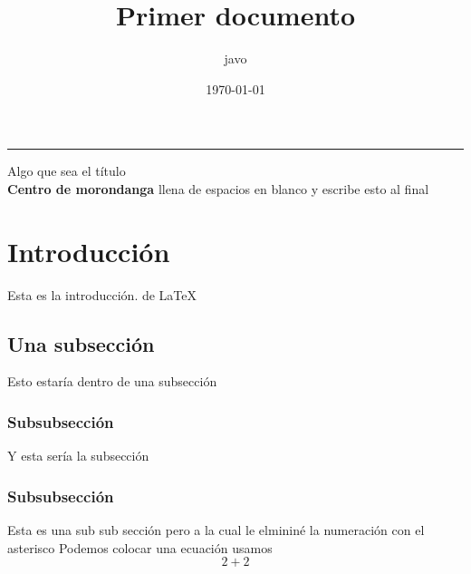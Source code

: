 \documentclass[12pt,letterpaper]{article} %
\author{javo}
\title{Primer documento}
\date{\today}
\begin{document}
	
	\begin{titlepage}
		\begin{center}
		\vspace*{2\baselineskip} %
		\hrule height 3pt
		\vspace*{0.5\baselineskip} 
		
		{\Huge Algo que sea el título}\\[0.1cm]
		{\large \textbf{Centro de morondanga}}
		\vfill{llena de espacios en blanco y escribe esto al final}
		\end{center}
	\end{titlepage}
	
	\section{Introducción}
	Esta es la introducción. de \LaTeX\
	\subsection{Una subsección}
	Esto estaría dentro de una subsección
	\subsubsection{Subsubsección}
	Y esta sería la subsección
	\subsubsection*{Subsubsección}
	Esta es una sub sub sección pero a la cual le elmininé la numeración con el asterisco
	Podemos colocar una ecuación usamos 
	\begin{equation}
		2+2
	\end{equation}
	
\end{document}
